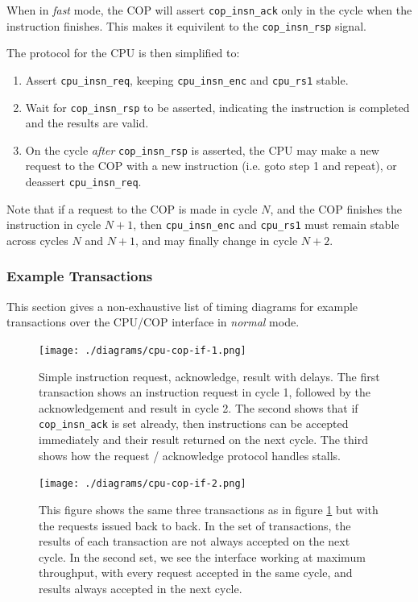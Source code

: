 \documentclass{article}
\begin{document}
When in {\em fast} mode, the COP will assert {\tt cop\_insn\_ack} only
in the cycle when the instruction finishes. This makes it equivilent
to the {\tt cop\_insn\_rsp} signal.

The protocol for the CPU is then simplified to:
\begin{enumerate}
\item
Assert {\tt cpu\_insn\_req}, keeping {\tt cpu\_insn\_enc} and
{\tt cpu\_rs1} stable.
\item
Wait for {\tt cop\_insn\_rsp} to be asserted, indicating the instruction
is completed and the results are valid.
\item
On the cycle {\em after} {\tt cop\_insn\_rsp} is asserted, the CPU may
make a new request to the COP with a new instruction (i.e. goto
step 1 and repeat), or deassert {\tt cpu\_insn\_req}.
\end{enumerate}

Note that if a request to the COP is made in cycle $N$, and the COP finishes
the instruction in cycle $N+1$, then 
{\tt cpu\_insn\_enc} and {\tt cpu\_rs1}
must remain stable across cycles $N$ and $N+1$, and may finally change
in cycle $N+2$.

\subsubsection{Example Transactions}

This section gives a non-exhaustive list of timing diagrams for example
transactions over the CPU/COP interface in {\em normal} mode.

\begin{figure}[H]
\centering
\texttt{[image: ./diagrams/cpu-cop-if-1.png]}
\caption{Simple instruction request, acknowledge, result with delays.
The first transaction shows an instruction request in cycle 1, followed
by the acknowledgement and result in cycle 2.
The second shows that if {\tt cop\_insn\_ack} is set already, then
instructions can be accepted immediately and their result returned on the next
cycle.  The third shows how the request / acknowledge protocol handles
stalls.}
\label{fig:cpu-cop-if-waves-1}
\end{figure}

\begin{figure}[H]
\centering
\texttt{[image: ./diagrams/cpu-cop-if-2.png]}
\caption{This figure shows the same three transactions as in figure
\ref{fig:cpu-cop-if-waves-1} but with the requests issued back to back.
In the set of transactions, the results of each transaction are not always
accepted on the next cycle. In the second set, we see the interface working
at maximum throughput, with every request accepted in the same cycle, and
results always accepted in the next cycle.}
\end{figure}
\end{document}
